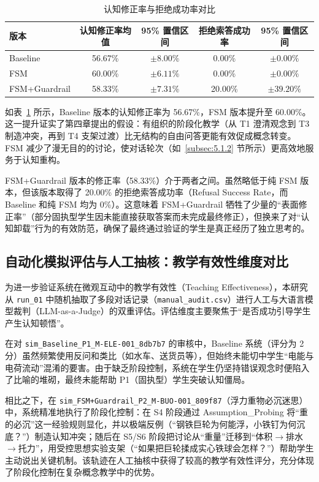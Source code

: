 \begin{table}[htbp]
    \centering
    \caption{认知修正率与拒绝成功率对比}
    \label{tab:correction-rate}
    \begin{tabular}{lcccc}
        \hline
        \textbf{版本} & \textbf{认知修正率均值} & \textbf{95\% 置信区间} & \textbf{拒绝索答成功率} & \textbf{95\% 置信区间} \\
        \hline
        Baseline & 56.67\% & $\pm 8.00\%$ & 0.00\% & $\pm 0.00\%$ \\
        FSM & 60.00\% & $\pm 6.11\%$ & 0.00\% & $\pm 0.00\%$ \\
        FSM+Guardrail & 58.33\% & $\pm 7.31\%$ & 20.00\% & $\pm 39.20\%$ \\
        \hline
    \end{tabular}
\end{table}

如表~\ref{tab:correction-rate} 所示，Baseline 版本的认知修正率为 56.67\%，FSM 版本提升至 60.00\%。这一提升证实了第四章提出的假设：有组织的阶段化教学（从 T1 澄清观念到 T3 制造冲突，再到 T4 支架过渡）比无结构的自由问答更能有效促成概念转变。FSM 减少了漫无目的的讨论，使对话轮次（如~\ref{subsec:5.1.2} 节所示）更高效地服务于认知重构。

FSM+Guardrail 版本的修正率（58.33\%）介于两者之间。虽然略低于纯 FSM 版本，但该版本取得了 20.00\% 的拒绝索答成功率（Refusal Success Rate，而 Baseline 和纯 FSM 均为 0\%）。这意味着 FSM+Guardrail 牺牲了少量的“表面修正率”（部分固执型学生因未能直接获取答案而未完成最终修正），但换来了对“认知卸载”行为的有效防范，确保了最终通过验证的学生是真正经历了独立思考的。

\subsection{自动化模拟评估与人工抽核：教学有效性维度对比}
\label{subsec:5.2.3}

为进一步验证系统在微观互动中的教学有效性（Teaching Effectiveness），本研究从 \texttt{run\_01} 中随机抽取了多段对话记录（\texttt{manual\_audit.csv}）进行人工与大语言模型裁判（LLM-as-a-Judge）的双重评估。评估维度主要聚焦于“是否成功引导学生产生认知顿悟”。

在对 \texttt{sim\_Baseline\_P1\_M-ELE-001\_8db7b7} 的审核中，Baseline 系统（评分为 2 分）虽然频繁使用反问和类比（如水车、送货员等），但始终未能切中学生“电能与电荷流动”混淆的要害。由于缺乏阶段控制，系统在学生仍坚持错误观念时便陷入了比喻的堆砌，最终未能帮助 P1（固执型）学生突破认知僵局。

相比之下，在 \texttt{sim\_FSM+Guardrail\_P2\_M-BUO-001\_809f87}（浮力重物必沉迷思）中，系统精准地执行了阶段化控制：在 S4 阶段通过 Assumption\_Probing 将“重的必沉”这一经验规则显化，并以极端反例（“钢铁巨轮为何能浮，小铁钉为何沉底？”）制造认知冲突；随后在 S5/S6 阶段把讨论从“重量”迁移到“体积$\rightarrow$排水$\rightarrow$托力”，用受控思想实验支架（“如果把巨轮揉成实心铁球会怎样？”）帮助学生主动说出关键机制。该轨迹在人工抽核中获得了较高的教学有效性评分，充分体现了阶段化控制在复杂概念教学中的优势。

